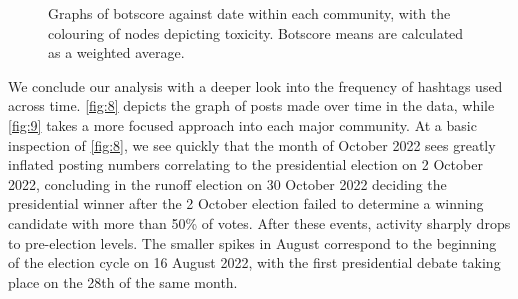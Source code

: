 \documentclass[a4paper,11pt]{article}  %
\begin{document}
	\begin{figure}%
		\begin{center}
		\end{center}
		\caption{Graphs of botscore against date within each community, with the colouring of nodes depicting toxicity. Botscore means are calculated as a weighted average.}
		\label{fig:9}
	\end{figure}\textbf{}
	We conclude our analysis with a deeper look into the frequency of hashtags used across time. \autoref{fig:8} depicts the graph of posts made over time in the data, while \autoref{fig:9} takes a more focused approach into each major community. At a basic inspection of \autoref{fig:8}, we see quickly that the month of October 2022 sees greatly inflated posting numbers correlating to the presidential election on 2 October 2022, concluding in the runoff election on 30 October 2022 deciding the presidential winner after the 2 October election failed to determine a winning candidate with more than 50\% of votes. After these events, activity sharply drops to pre-election levels. The smaller spikes in August correspond to the beginning of the election cycle on 16 August 2022, with the first presidential debate taking place on the 28th of the same month.
	
\end{document}

